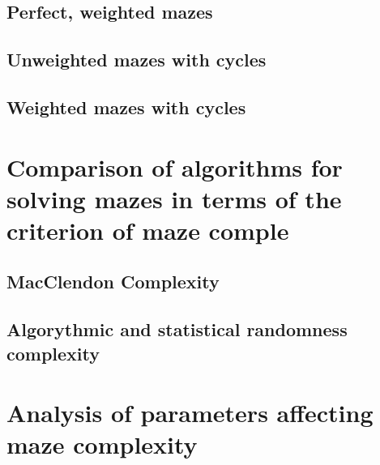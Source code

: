\subsection{Perfect, weighted mazes}
\subsection{Unweighted mazes with cycles}
\subsection{Weighted mazes with cycles }
\section{Comparison of algorithms for solving mazes in terms of the criterion of maze comple}
\subsection{MacClendon Complexity}
\subsection{Algorythmic and statistical randomness complexity}
\section{Analysis of parameters affecting maze complexity}
